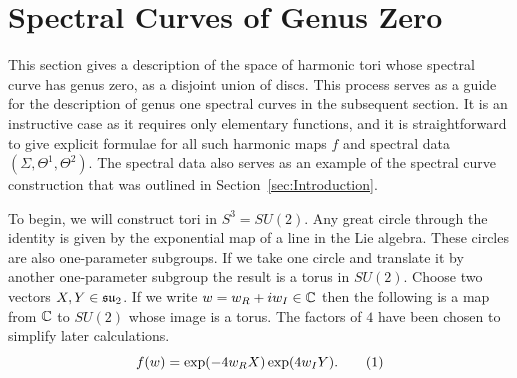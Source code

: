 \documentclass{article}
\begin{document}
\section{Spectral Curves of Genus Zero}\label{sec:Genus Zero}

This section gives a description of the space of harmonic tori whose spectral curve has genus zero, as a disjoint union of discs. This process serves as a guide for the description of genus one spectral curves in the subsequent section. It is an instructive case as it requires only elementary functions, and it is straightforward to give explicit formulae for all such harmonic maps $f$ and spectral data $(\Sigma,\Theta^1,\Theta^2)$. The spectral data also serves as an example of the spectral curve construction that was outlined in Section~\ref{sec:Introduction}. 


To begin, we will construct tori in $S^3 = SU(2)$. Any great circle through the identity is given by the exponential map of a line in the Lie algebra. These circles are also one-parameter subgroups. If we take one circle and translate it by another one-parameter subgroup the result is a torus in $SU(2)$. Choose two vectors $X,Y\in \mathfrak{su}_2$. If we write $w = w_R + i w_I \in \mathbb{C}$ then the following is a map from $\mathbb{C}$ to $SU(2)$ whose image is a torus. The factors of $4$ have been chosen to simplify later calculations. 
\[
f(w) = \exp( -4 w_R X ) \exp( 4 w_I Y ).
\labelthis{eqn:genus zero simple map}
\]
\end{document}
